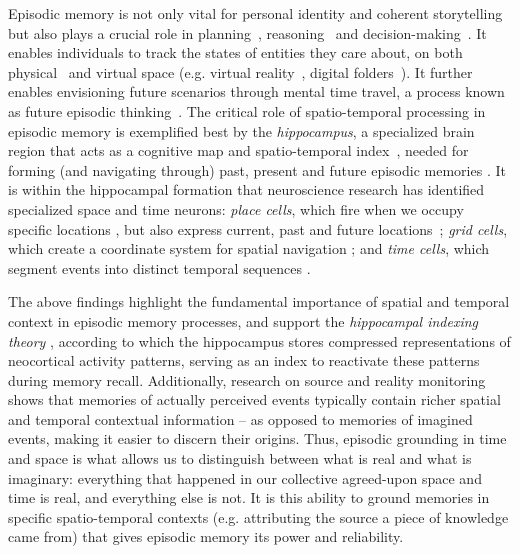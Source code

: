 \documentclass{article}
\begin{document}
Episodic memory is not only vital for personal identity and coherent storytelling but also plays a crucial role in planning~\citep{pfeiffer2013hippocampal,olafsdottir2015hippocampal},
reasoning~\citep{dusek1997hippocampus} and decision-making~\citep{barron2013online}. It enables individuals to track the states of entities they care about, on both physical~\citep{burgess2002human} and  virtual space 
  (e.g. virtual reality~\citep{cushman2008detecting}, digital folders~\cite{benn2015navigating}). It further enables  envisioning future scenarios through mental time travel, a process known as future episodic thinking~\citep{atance2001episodic,schacter2016remembering}. 
The critical role of spatio-temporal processing in episodic memory is exemplified best by the \textit{hippocampus}, a specialized brain region that acts as a cognitive map and spatio-temporal index~\citep{o1978hippocampus,teyler1986hippocampal}, needed for forming (and navigating through) past, present and future episodic memories \citep{tanaka2014cortical,teyler2007hippocampal}. It is within the hippocampal formation that neuroscience research has identified specialized space and time neurons: \textit{place cells}, which fire when we occupy specific locations \citep{o1971hippocampus}, but also express current, past and future locations~\citep{moser2015place}; \textit{grid cells}, which create a coordinate system for spatial navigation \citep{hafting2005microstructure}; and \textit{time cells}, which segment events into distinct temporal sequences \citep{macdonald2011hippocampal}. 

The above findings highlight the fundamental importance of spatial and temporal context in episodic memory processes, and support the \textit{hippocampal indexing theory }\citep{teyler1986hippocampal,teyler2007hippocampal}, according to which the hippocampus stores compressed representations of neocortical activity patterns, serving as an index to reactivate these patterns during memory recall.
Additionally, research on source and reality monitoring \citep{johnson1981reality,johnson1993source,garrison2017monitoring} shows that memories of actually perceived events typically contain richer spatial and temporal contextual information -- as opposed to memories of imagined events, making it easier to discern their origins.
Thus, episodic grounding in time and space is what allows us to distinguish between what is real and what is imaginary: everything that happened in our collective agreed-upon space and time is real, and everything else is not. It is this ability to ground memories in specific spatio-temporal contexts (e.g. attributing the source a piece of knowledge came from) that gives episodic memory its power and reliability. 
\end{document}
